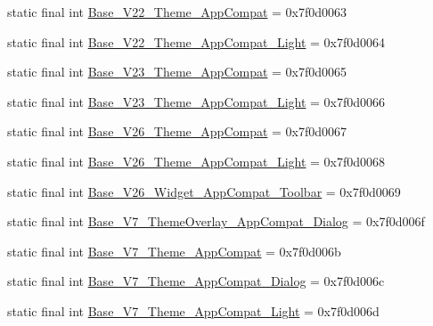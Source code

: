 \begin{DoxyCompactItemize}
\item 
static final int \mbox{\hyperlink{classandroid_1_1support_1_1v7_1_1appcompat_1_1R_1_1style_a7e00a5c99ed370c04f91b6082c20eab7}{Base\+\_\+\+V22\+\_\+\+Theme\+\_\+\+App\+Compat}} = 0x7f0d0063
\item 
static final int \mbox{\hyperlink{classandroid_1_1support_1_1v7_1_1appcompat_1_1R_1_1style_a26869f46923cbd24e2e79aaef1c05467}{Base\+\_\+\+V22\+\_\+\+Theme\+\_\+\+App\+Compat\+\_\+\+Light}} = 0x7f0d0064
\item 
static final int \mbox{\hyperlink{classandroid_1_1support_1_1v7_1_1appcompat_1_1R_1_1style_aeb390174348a40b9d377b252a7727d39}{Base\+\_\+\+V23\+\_\+\+Theme\+\_\+\+App\+Compat}} = 0x7f0d0065
\item 
static final int \mbox{\hyperlink{classandroid_1_1support_1_1v7_1_1appcompat_1_1R_1_1style_a7d90475931148b5ca67b10d2fdc370b5}{Base\+\_\+\+V23\+\_\+\+Theme\+\_\+\+App\+Compat\+\_\+\+Light}} = 0x7f0d0066
\item 
static final int \mbox{\hyperlink{classandroid_1_1support_1_1v7_1_1appcompat_1_1R_1_1style_a0b6cbb8d8f09faf5399f19ea7ea981ad}{Base\+\_\+\+V26\+\_\+\+Theme\+\_\+\+App\+Compat}} = 0x7f0d0067
\item 
static final int \mbox{\hyperlink{classandroid_1_1support_1_1v7_1_1appcompat_1_1R_1_1style_a86627c51c210088bc5dc98055d76e959}{Base\+\_\+\+V26\+\_\+\+Theme\+\_\+\+App\+Compat\+\_\+\+Light}} = 0x7f0d0068
\item 
static final int \mbox{\hyperlink{classandroid_1_1support_1_1v7_1_1appcompat_1_1R_1_1style_a0a6f72301d58995b809570a0a7012f42}{Base\+\_\+\+V26\+\_\+\+Widget\+\_\+\+App\+Compat\+\_\+\+Toolbar}} = 0x7f0d0069
\item 
static final int \mbox{\hyperlink{classandroid_1_1support_1_1v7_1_1appcompat_1_1R_1_1style_aa289bd63117308a21c969dc70fad616e}{Base\+\_\+\+V7\+\_\+\+Theme\+Overlay\+\_\+\+App\+Compat\+\_\+\+Dialog}} = 0x7f0d006f
\item 
static final int \mbox{\hyperlink{classandroid_1_1support_1_1v7_1_1appcompat_1_1R_1_1style_af7bbf205eddb9f8c00176de5b1e9f819}{Base\+\_\+\+V7\+\_\+\+Theme\+\_\+\+App\+Compat}} = 0x7f0d006b
\item 
static final int \mbox{\hyperlink{classandroid_1_1support_1_1v7_1_1appcompat_1_1R_1_1style_ac7263441f275d66e68fdf170d1031abe}{Base\+\_\+\+V7\+\_\+\+Theme\+\_\+\+App\+Compat\+\_\+\+Dialog}} = 0x7f0d006c
\item 
static final int \mbox{\hyperlink{classandroid_1_1support_1_1v7_1_1appcompat_1_1R_1_1style_a447ddfdca58adb0c8720b9efcd480886}{Base\+\_\+\+V7\+\_\+\+Theme\+\_\+\+App\+Compat\+\_\+\+Light}} = 0x7f0d006d

\end{DoxyCompactItemize}
